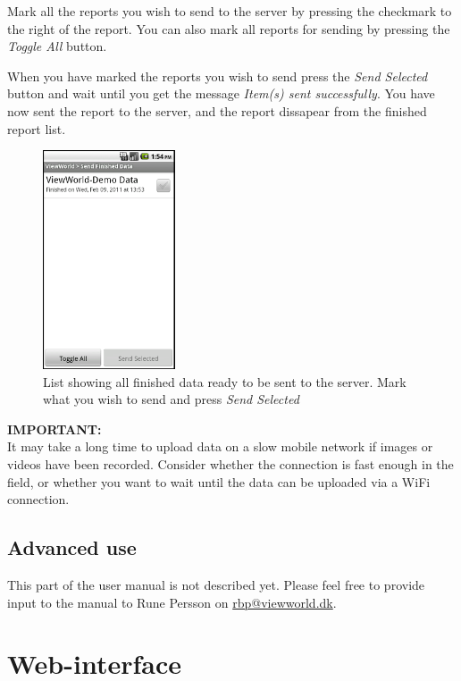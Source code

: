 \documentclass[a4paper, 12pt, final]{article}
\begin{document}
Mark all the reports you wish to send to the server by pressing the checkmark to the right of the report. You can also mark all reports for sending by pressing the \emph{Toggle All} button.

When you have marked the reports you wish to send press the \emph{Send Selected} button and wait until you get the message \emph{Item(s) sent successfully}. You have now sent the report to the server, and the report dissapear from the finished report list.

\begin{figure}[H]
  \centering
      \includegraphics[width=0.35\textwidth]{pics/send_finished_data.png}
  \caption{List showing all finished data ready to be sent to the server. Mark what you wish to send and press \emph{Send Selected}}
  \label{fig:send_finished_data}
\end{figure}

\vspace{0.5cm}
\begin{boxedminipage}{\textwidth}
\textbf{IMPORTANT:}\\It may take a long time to upload data on a slow mobile network if images or videos have been recorded. Consider whether the connection is fast enough in the field, or whether you want to wait until the data can be uploaded via a WiFi connection.
\end{boxedminipage}

\subsection{Advanced use}
This part of the user manual is not described yet. Please feel free to provide input to the manual to Rune Persson on \url{rbp@viewworld.dk}.


\section{Web-interface}
\end{document}
